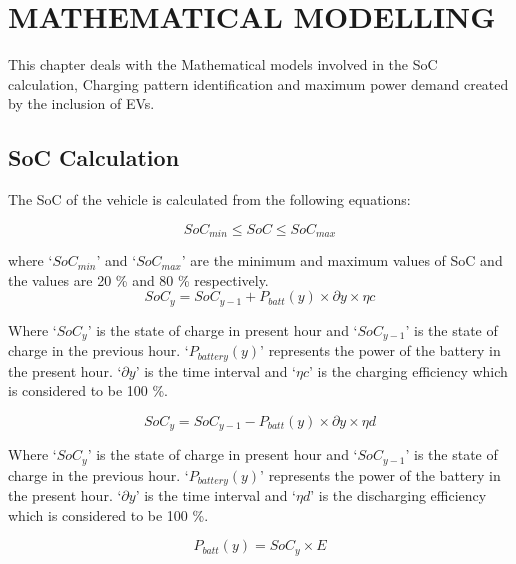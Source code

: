 	\chapter{MATHEMATICAL MODELLING}
	\label{chap:mathmodel}
	This chapter deals with the Mathematical models involved in the SoC calculation, Charging pattern identification and maximum power demand created by the inclusion of EVs.
	
	\section{SoC Calculation}
	
	
		
	The SoC of the vehicle is calculated from the following equations:
	

			\begin{equation}
		                             SoC_{min} \leq SoC \leq SoC_{max}\label{eq:socminmax}
		    \end{equation}
	    
where `$SoC_{min}$'  and `$SoC_{max}$' are the minimum and maximum values of SoC and the values are 20 \% and 80 \% respectively.
		    \begin{equation}                         
		               SoC_{y} = SoC_{y-1} + P_{batt}(y) \times \partial y \times \eta c
			\end{equation}
		
		Where `$SoC_{y}$' is the state of charge in present hour and `$SoC_{y-1}$' is the state of charge in the previous hour. `$P_{battery}(y)$' represents the power of the battery in the present hour. `$\partial y$' is the time interval and `$\eta c$' is the charging efficiency which is considered to be 100 \%. 
		
		    \begin{equation}             
		               SoC_{y} = SoC_{y-1} - P_{batt}(y) \times \partial y \times \eta d
			\end{equation}
		
		Where `$SoC_{y}$' is the state of charge in present hour and `$SoC_{y-1}$' is the state of charge in the previous hour. `$P_{battery}(y)$' represents the power of the battery in the present hour. `$\partial y$' is the time interval and `$\eta d$' is the discharging efficiency which is considered to be 100 \%.
		
		    \begin{equation}             
		               P_{batt}(y) = SoC_{y} \times E
		    \end{equation}
	    
